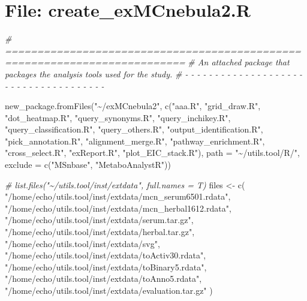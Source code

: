 \documentclass[
]{article}
\newenvironment{Shaded}{\begin{snugshade}}{\end{snugshade}}
\newcommand{\AttributeTok}[1]{\textcolor[rgb]{0.77,0.63,0.00}{#1}}
\newcommand{\CommentTok}[1]{\textcolor[rgb]{0.56,0.35,0.01}{\textit{#1}}}
\newcommand{\FunctionTok}[1]{\textcolor[rgb]{0.00,0.00,0.00}{#1}}
\newcommand{\NormalTok}[1]{#1}
\newcommand{\OtherTok}[1]{\textcolor[rgb]{0.56,0.35,0.01}{#1}}
\newcommand{\StringTok}[1]{\textcolor[rgb]{0.31,0.60,0.02}{#1}}
\begin{document}
\hypertarget{file-create_exmcnebula2.r}{%
\section{File: create\_exMCnebula2.R}\label{file-create_exmcnebula2.r}}

\begin{Shaded}
\begin{Highlighting}[]
\CommentTok{\# ==========================================================================}
\CommentTok{\# An attached package that packages the analysis tools used for the study.}
\CommentTok{\# {-} {-} {-} {-} {-} {-} {-} {-} {-} {-} {-} {-} {-} {-} {-} {-} {-} {-} {-} {-} {-} {-} {-} {-} {-} {-} {-} {-} {-} {-} {-} {-} {-} {-} {-} {-} {-}}

\FunctionTok{new\_package.fromFiles}\NormalTok{(}\StringTok{"\textasciitilde{}/exMCnebula2"}\NormalTok{,}
  \FunctionTok{c}\NormalTok{(}\StringTok{"aaa.R"}\NormalTok{, }\StringTok{"grid\_draw.R"}\NormalTok{, }\StringTok{"dot\_heatmap.R"}\NormalTok{, }\StringTok{"query\_synonyms.R"}\NormalTok{,}
    \StringTok{"query\_inchikey.R"}\NormalTok{, }\StringTok{"query\_classification.R"}\NormalTok{, }\StringTok{"query\_others.R"}\NormalTok{,}
    \StringTok{"output\_identification.R"}\NormalTok{, }\StringTok{"pick\_annotation.R"}\NormalTok{, }\StringTok{"alignment\_merge.R"}\NormalTok{,}
    \StringTok{"pathway\_enrichment.R"}\NormalTok{, }\StringTok{"cross\_select.R"}\NormalTok{, }\StringTok{"exReport.R"}\NormalTok{, }\StringTok{"plot\_EIC\_stack.R"}\NormalTok{),}
  \AttributeTok{path =} \StringTok{"\textasciitilde{}/utils.tool/R/"}\NormalTok{, }\AttributeTok{exclude =} \FunctionTok{c}\NormalTok{(}\StringTok{"MSnbase"}\NormalTok{, }\StringTok{"MetaboAnalystR"}\NormalTok{))}

\CommentTok{\# list.files("\textasciitilde{}/utils.tool/inst/extdata", full.names = T)}
\NormalTok{files }\OtherTok{\textless{}{-}} \FunctionTok{c}\NormalTok{(}
  \StringTok{"/home/echo/utils.tool/inst/extdata/mcn\_serum6501.rdata"}\NormalTok{,}
  \StringTok{"/home/echo/utils.tool/inst/extdata/mcn\_herbal1612.rdata"}\NormalTok{,}
  \StringTok{"/home/echo/utils.tool/inst/extdata/serum.tar.gz"}\NormalTok{,}
  \StringTok{"/home/echo/utils.tool/inst/extdata/herbal.tar.gz"}\NormalTok{,}
  \StringTok{"/home/echo/utils.tool/inst/extdata/svg"}\NormalTok{,}
  \StringTok{"/home/echo/utils.tool/inst/extdata/toActiv30.rdata"}\NormalTok{,}
  \StringTok{"/home/echo/utils.tool/inst/extdata/toBinary5.rdata"}\NormalTok{,}
  \StringTok{"/home/echo/utils.tool/inst/extdata/toAnno5.rdata"}\NormalTok{,}
  \StringTok{"/home/echo/utils.tool/inst/extdata/evaluation.tar.gz"}
\NormalTok{)}


\end{Highlighting}
\end{Shaded}
\end{document}
